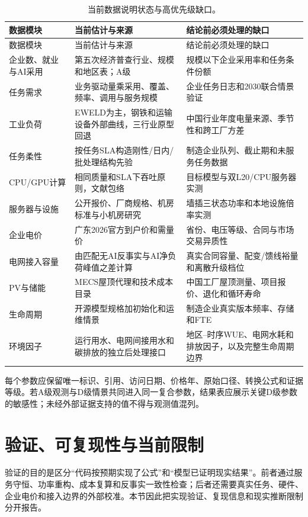 \documentclass[preprint]{elsarticle}
\begin{document}
\begin{longtable}{p{3.3cm}p{6.0cm}p{5.4cm}}
 \caption{当前数据说明状态与高优先级缺口。}\label{tab:data-status}\\
 \toprule
 数据模块 & 当前估计与来源 & 结论前必须处理的缺口 \\
 \midrule
 \endfirsthead
 \toprule
 数据模块 & 当前估计与来源 & 结论前必须处理的缺口 \\
 \midrule
 \endhead
 企业数、就业与AI采用 & 第五次经济普查行业、规模和地区表；A级 & 规模以下企业采用率和任务条件份额 \\
 任务需求 & 业务驱动量乘采用、覆盖、频率、调用与服务规模 & 企业任务日志和2030联合情景验证 \\
 工业负荷 & EWELD为主，钢铁和运输设备外部曲线，三行业原型回退 & 中国行业年度电量来源、季节性和跨工厂方差 \\
 任务柔性 & 按任务SLA构造刚性/日内/批处理结构先验 & 制造企业队列、截止期和未服务任务数据 \\
 CPU/GPU计算 & 相同质量和SLA下吞吐原则，文献包络 & 目标模型与双L20/CPU服务器实测 \\
 服务器与设施 & 公开报价、厂商规格、机房标准与小机房研究 & 墙插三状态功率和本地设施倍率实测 \\
 企业电价 & 广东2026官方到户价和需量价 & 省份、电压等级、合同与市场交易异质性 \\
 电网接入容量 & 由匹配无AI反事实与AI净负荷峰值之差计算 & 真实合同容量、配变/馈线裕量和离散升级档位 \\
 PV与储能 & MECS屋顶代理和技术成本目录 & 中国工厂屋顶测量、项目报价、退化和循环寿命 \\
 生命周期 & 开源模型规格加初始化和运维情景 & 制造企业真实版本频率、存储和FTE \\
 环境因子 & 运行用水、电网间接用水和碳排放的独立后处理接口 & 地区--时序WUE、电网水耗和排放因子，以及完整生命周期边界 \\
 \bottomrule
\end{longtable}

每个参数应保留唯一标识、引用、访问日期、价格年、原始口径、转换公式和证据等级。若A级观测与D级情景共同进入同一复合参数，结果表应展示关键D级参数的敏感性；未经外部证据支持的值不得与观测值混列。

\section{验证、可复现性与当前限制}

验证的目的是区分“代码按预期实现了公式”和“模型已证明现实结果”。前者通过服务守恒、功率重构、成本复算和反事实一致性检查；后者还需要真实任务、硬件、企业电价和接入边界的外部校准。本节因此把实现验证、复现信息和现实推断限制分开报告。
\end{document}
